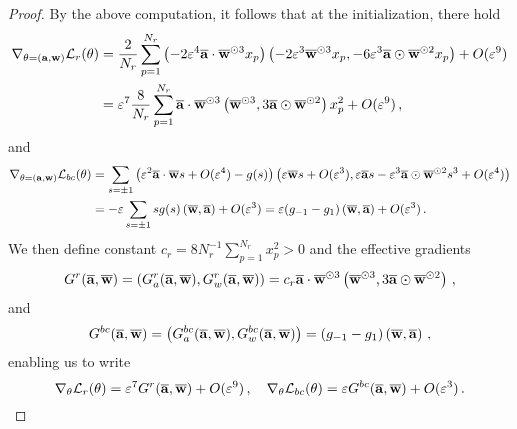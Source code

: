 \begin{proof}
By the above computation, it follows that at the initialization, there hold
\begin{align*}
      \nabla_{\theta = (\mathbf{a}, \mathbf{w})} \mathcal{L}_r(\theta) & = \frac{2}{N_r} \sum_{p = 1}^{N_r} \left(- 2 \varepsilon^4  \overline{\mathbf{a}} \cdot \overline{\mathbf{w}}^{\odot 3} x_p \right) \left(- 2 \varepsilon^3 \overline{\mathbf{w}}^{\odot 3} x_p,   - 6 \varepsilon^3 \overline{\mathbf{a}} \odot \overline{\mathbf{w}}^{\odot 2} x_p   \right) + O(\varepsilon^9)  \\ 
      & = \varepsilon^7 \frac{8}{N_r} \sum_{p = 1}^{N_r} \overline{\mathbf{a}} \cdot \overline{\mathbf{w}}^{\odot 3} \left(  \overline{\mathbf{w}}^{\odot 3},   3  \overline{\mathbf{a}} \odot \overline{\mathbf{w}}^{\odot 2}  \right) x_p^2 + O(\varepsilon^9)\,,
\end{align*}
and 
\begin{align*}
        \nabla_{\theta = (\mathbf{a}, \mathbf{w})} \mathcal{L}_{bc}(\theta) & = \sum_{s = \pm 1} \left(\varepsilon^2 \overline{\mathbf{a}} \cdot \overline{\mathbf{w}} s + O(\varepsilon^4) - g(s)\right) \left(\varepsilon \overline{\mathbf{w}} s + O(\varepsilon^3), \varepsilon \overline{\mathbf{a}} s - \varepsilon^3 \overline{\mathbf{a}} \odot \overline{\mathbf{w}}^{\odot 2} s^3 + O(\varepsilon^4) \right) \\
        & = - \varepsilon \sum_{s = \pm 1} s g(s) \left(\overline{\mathbf{w}}, \overline{\mathbf{a}} \right) + O(\varepsilon^3) =  \varepsilon (g_{-1} - g_1) \left(\overline{\mathbf{w}}, \overline{\mathbf{a}} \right) + O(\varepsilon^3)\,.
\end{align*}
We then define constant $c_r = 8 N_r^{-1} \sum_{p = 1}^{N_r} x_p^2 > 0$ and the effective gradients 
\begin{align} 
    G^r(\overline{\mathbf{a}},\overline{\mathbf{w}}) = \left(G^r_a(\overline{\mathbf{a}},\overline{\mathbf{w}}), G^r_w(\overline{\mathbf{a}},\overline{\mathbf{w}})\right) =  c_r  \overline{\mathbf{a}} \cdot \overline{\mathbf{w}}^{\odot 3} \left(  \overline{\mathbf{w}}^{\odot 3},   3  \overline{\mathbf{a}} \odot \overline{\mathbf{w}}^{\odot 2}  \right)\,,
\end{align}
and 
\begin{align}  
    G^{bc}(\overline{\mathbf{a}},\overline{\mathbf{w}}) = \left(G^{bc}_a(\overline{\mathbf{a}},\overline{\mathbf{w}}), G^{bc}_w(\overline{\mathbf{a}},\overline{\mathbf{w}})\right) = (g_{-1} - g_1) \left(\overline{\mathbf{w}}, \overline{\mathbf{a}} \right)\,,
\end{align}
enabling us to write 
\begin{equation} \label{eq:effecgrad}
    \nabla_\theta \mathcal{L}_r(\theta) = \varepsilon^7 G^r(\overline{\mathbf{a}},\overline{\mathbf{w}}) + O(\varepsilon^9)\,, \quad \nabla_{\theta} \mathcal{L}_{bc}(\theta) = \varepsilon G^{bc}(\overline{\mathbf{a}},\overline{\mathbf{w}}) + O(\varepsilon^3)\,.
\end{equation}
\end{proof}



